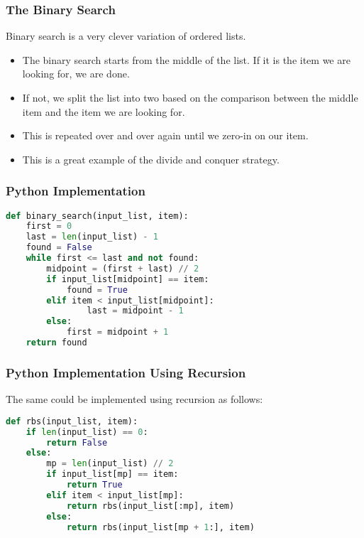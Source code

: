 \documentclass{beamer}
\begin{document}
\begin{frame}
\frametitle{The Binary Search}
Binary search is a very clever variation of ordered lists.
\begin{itemize}
\item The binary search starts from the middle of the list. If it is the item we are looking for, we are done.
\item If not, we split the list into two based on the comparison between the middle item and the item we are looking for.
\item This is repeated over and over again until we zero-in on our item.
\item This is a great example of the divide and conquer strategy.
\end{itemize}
\end{frame}

\begin{frame}[fragile]
\frametitle{Python Implementation}
\begin{lstlisting}[language=Python]
def binary_search(input_list, item):
    first = 0
    last = len(input_list) - 1
    found = False
    while first <= last and not found:
        midpoint = (first + last) // 2
        if input_list[midpoint] == item:
            found = True
        elif item < input_list[midpoint]:
                last = midpoint - 1
        else:
            first = midpoint + 1
    return found
\end{lstlisting}
\end{frame}

\begin{frame}[fragile]
\frametitle{Python Implementation Using Recursion}
The same could be implemented using recursion as follows:
\begin{lstlisting}[language=Python]
def rbs(input_list, item):
    if len(input_list) == 0:
        return False
    else:
        mp = len(input_list) // 2
        if input_list[mp] == item:
            return True
        elif item < input_list[mp]:
            return rbs(input_list[:mp], item)
        else:
            return rbs(input_list[mp + 1:], item)
\end{lstlisting}
\end{frame}
\end{document}
